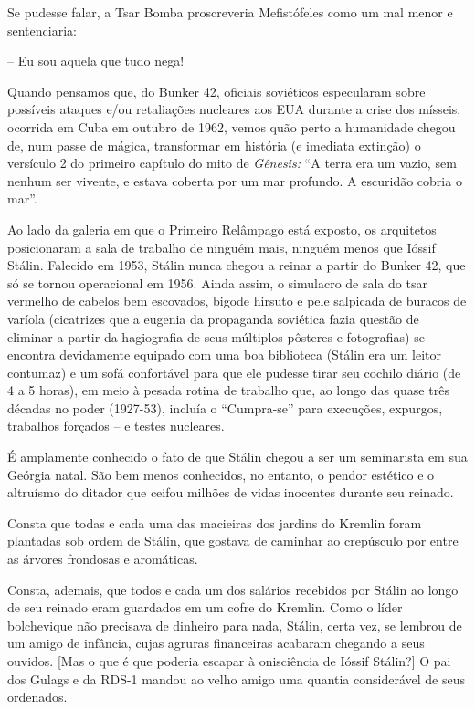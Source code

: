 Se pudesse falar, a Tsar Bomba proscreveria Mefistófeles como um mal
menor e sentenciaria:

-- Eu sou aquela que tudo nega!

Quando pensamos que, do Bunker 42, oficiais soviéticos especularam sobre
possíveis ataques e/ou retaliações nucleares aos EUA durante a crise dos
mísseis, ocorrida em Cuba em outubro de 1962, vemos quão perto a
humanidade chegou de, num passe de mágica, transformar em história (e
imediata extinção) o versículo 2 do primeiro capítulo do mito de
\emph{Gênesis:} ``A terra era um vazio, sem nenhum ser vivente, e estava
coberta por um mar profundo. A escuridão cobria o mar''.

Ao lado da galeria em que o Primeiro Relâmpago está exposto, os
arquitetos posicionaram a sala de trabalho de ninguém mais, ninguém
menos que Ióssif Stálin. Falecido em 1953, Stálin nunca chegou a reinar
a partir do Bunker 42, que só se tornou operacional em 1956. Ainda
assim, o simulacro de sala do tsar vermelho de cabelos bem escovados,
bigode hirsuto e pele salpicada de buracos de varíola (cicatrizes que a
eugenia da propaganda soviética fazia questão de eliminar a partir da
hagiografia de seus múltiplos pôsteres e fotografias) se encontra
devidamente equipado com uma boa biblioteca (Stálin era um leitor
contumaz) e um sofá confortável para que ele pudesse tirar seu cochilo
diário (de 4 a 5 horas), em meio à pesada rotina de trabalho que, ao
longo das quase três décadas no poder (1927-53), incluía o ``Cumpra-se''
para execuções, expurgos, trabalhos forçados -- e testes nucleares.

É amplamente conhecido o fato de que Stálin chegou a ser um seminarista
em sua Geórgia natal. São bem menos conhecidos, no entanto, o pendor
estético e o altruísmo do ditador que ceifou milhões de vidas inocentes
durante seu reinado.

Consta que todas e cada uma das macieiras dos jardins do Kremlin foram
plantadas sob ordem de Stálin, que gostava de caminhar ao crepúsculo por
entre as árvores frondosas e aromáticas.

Consta, ademais, que todos e cada um dos salários recebidos por Stálin
ao longo de seu reinado eram guardados em um cofre do Kremlin. Como o
líder bolchevique não precisava de dinheiro para nada, Stálin, certa
vez, se lembrou de um amigo de infância, cujas agruras financeiras
acabaram chegando a seus ouvidos. {[}Mas o que é que poderia escapar à
onisciência de Ióssif Stálin?{]} O pai dos Gulags e da RDS-1 mandou ao
velho amigo uma quantia considerável de seus ordenados.

